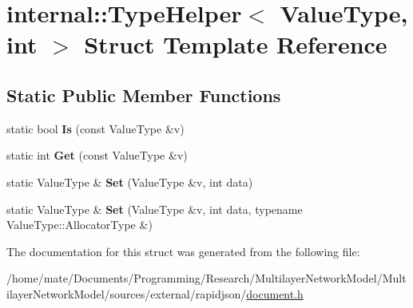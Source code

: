 \hypertarget{structinternal_1_1TypeHelper_3_01ValueType_00_01int_01_4}{}\section{internal\+:\+:Type\+Helper$<$ Value\+Type, int $>$ Struct Template Reference}
\label{structinternal_1_1TypeHelper_3_01ValueType_00_01int_01_4}
\subsection*{Static Public Member Functions}
\begin{DoxyCompactItemize}
\item 
static bool {\bfseries Is} (const Value\+Type \&v)\hypertarget{structinternal_1_1TypeHelper_3_01ValueType_00_01int_01_4_aa17ef940501aac12fd7934ef979c607e}{}\label{structinternal_1_1TypeHelper_3_01ValueType_00_01int_01_4_aa17ef940501aac12fd7934ef979c607e}

\item 
static int {\bfseries Get} (const Value\+Type \&v)\hypertarget{structinternal_1_1TypeHelper_3_01ValueType_00_01int_01_4_a98c331ac026873b9ad4ba68e7bf28446}{}\label{structinternal_1_1TypeHelper_3_01ValueType_00_01int_01_4_a98c331ac026873b9ad4ba68e7bf28446}

\item 
static Value\+Type \& {\bfseries Set} (Value\+Type \&v, int data)\hypertarget{structinternal_1_1TypeHelper_3_01ValueType_00_01int_01_4_aceea0a0fac6684e53a9d9f66da4154cd}{}\label{structinternal_1_1TypeHelper_3_01ValueType_00_01int_01_4_aceea0a0fac6684e53a9d9f66da4154cd}

\item 
static Value\+Type \& {\bfseries Set} (Value\+Type \&v, int data, typename Value\+Type\+::\+Allocator\+Type \&)\hypertarget{structinternal_1_1TypeHelper_3_01ValueType_00_01int_01_4_a2ca21bedcaeaf0fffe913edb2fe1a66a}{}\label{structinternal_1_1TypeHelper_3_01ValueType_00_01int_01_4_a2ca21bedcaeaf0fffe913edb2fe1a66a}

\end{DoxyCompactItemize}


The documentation for this struct was generated from the following file\+:\begin{DoxyCompactItemize}
\item 
/home/mate/\+Documents/\+Programming/\+Research/\+Multilayer\+Network\+Model/\+Multilayer\+Network\+Model/sources/external/rapidjson/\hyperlink{document_8h}{document.\+h}\end{DoxyCompactItemize}
